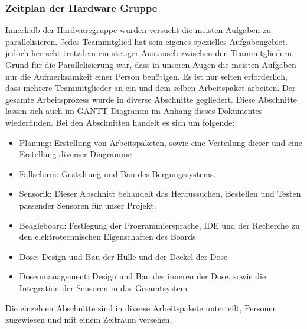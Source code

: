 \subsubsection{Zeitplan der Hardware Gruppe}
Innerhalb der Hardwaregruppe wurden versucht die meisten Aufgaben zu parallelisieren. Jedes Teammitglied hat sein eigenes spezielles Aufgabengebiet. jedoch herrscht trotzdem ein stetiger Austausch zwischen den Teammitgliedern. Grund für die Parallelisierung war, dass in unseren Augen die meisten Aufgaben  nur die Aufmerksamkeit einer Person benötigen. Es ist nur selten erforderlich, dass mehrere Teammitglieder an ein und dem selben Arbeitspaket arbeiten. Der gesamte Arbeitsprozess wurde in diverse Abschnitte gegliedert. Diese Abschnitte lassen sich auch im GANTT Diagramm im Anhang dieses Dokumentes wiederfinden. Bei den Abschnitten handelt es sich um folgende:
\begin{itemize}
\item Planung: Erstellung von Arbeitspaketen, sowie eine Verteilung dieser und eine Erstellung diverser Diagramme
\item Fallschirm: Gestaltung und Bau des Bergungssystems.
\item Sensorik: Dieser Abschnitt behandelt das Heraussuchen, Bestellen und Testen passender Sensoren für unser Projekt.
\item Beagleboard: Festlegung der Programmiersprache, IDE und der Recherche zu den elektrotechnischen Eigenschaften des Boards
\item Dose: Design und Bau der Hülle und der Deckel der Dose
\item Dosenmanagement: Design und Bau des inneren der Dose, sowie die Integration der Sensoren in das Gesamtsystem
\end{itemize}

Die einzelnen Abschnitte sind in diverse Arbeitspakete unterteilt, Personen zugewiesen und mit einem Zeitraum versehen.

